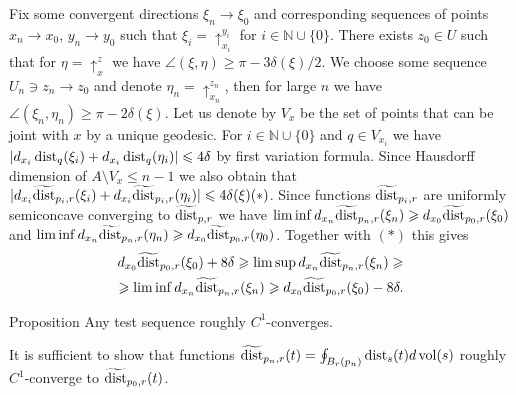 \documentclass[a4paper,10pt]{article}
\begin{document}
Fix some convergent directions $\xi_n\to\xi_0$ and
corresponding sequences of points
$x_n\to x_0$, $y_n\to y_0$
such that  $\xi_i=\uparrow_{x_i}^{y_i}$ for $i\in\mathbb N\cup\{0\}$.
There exists $z_0 \in U$ such that for $\eta=\uparrow_x^z$ 
we have
$\angle(\xi,\eta)\ge \pi-3\delta(\xi)/2$.
We choose some sequence 
$U_n\ni z_n\to z_0$
and denote
$\eta_n=\uparrow_{x_n}^{z_n}$,
then for large $n$ we have $\angle(\xi_n,\eta_n)\ge \pi-2\delta(\xi)$.
Let us denote by $V_x$ be the set of points that can be joint with $x$
by a unique geodesic. For $i\in\mathbb N\cup\{0\}$ and
$q\in V_{x_i}$ we have $|d_{x_i} \operatorname{dist}_q(\xi_i)+d_{x_i} \operatorname{dist}_q(\eta_i)|\leqslant 4\delta$ by first
variation formula.
Since Hausdorff dimension of $A\setminus V_x\le n-1$ we also obtain
that
$|d_{x_i} \widetilde{\operatorname{dist}}_{p_i,r}(\xi_i)+d_{x_i} \widetilde{\operatorname{dist}}_{p_i,r}(\eta_i)|\leqslant 4\delta(\xi) (*)$.
Since functions
$\widetilde{\operatorname{dist}}_{p_i,r}$ are uniformly semiconcave converging to
$\widetilde{\operatorname{dist}}_{p,r}$ we have
$\liminf d_{x_n}\widetilde{\operatorname{dist}}_{p_n,r}(\xi_n)\geqslant d_{x_0}\widetilde{\operatorname{dist}}_{p_0,r}(\xi_0)$ and $\liminf d_{x_n}\widetilde{\operatorname{dist}}_{p_n,r}(\eta_n)\geqslant d_{x_0}\widetilde{\operatorname{dist}}_{p_0,r}(\eta_0)$.
Together with $(*)$ this gives
\begin{align*}
 d_{x_0}\widetilde{\operatorname{dist}}_{p_0,r}(\xi_0)+8\delta\geqslant
\limsup d_{x_n}\widetilde{\operatorname{dist}}_{p_n,r}(\xi_n)\geqslant\\
\geqslant
\liminf d_{x_n}\widetilde{\operatorname{dist}}_{p_n,r}(\xi_n)\geqslant d_{x_0}\widetilde{\operatorname{dist}}_{p_0,r}(\xi_0)-8\delta.
\end{align*}





\begin{thm}{Proposition}
Any test sequence roughly $C^1$-converges.
\end{thm}
It is sufficient to show  that functions
$\widetilde{\operatorname{dist}}_{p_n,r}(t) =\oint_{B_r(p_n)} \operatorname{dist}_{s}(t)d\operatorname{vol}(s)$
roughly $C^1$-converge to $\widetilde{\operatorname{dist}}_{p_0,r}(t)$.
\end{document}
